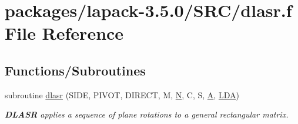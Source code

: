 \hypertarget{dlasr_8f}{}\section{packages/lapack-\/3.5.0/\+S\+R\+C/dlasr.f File Reference}
\label{dlasr_8f}
\subsection*{Functions/\+Subroutines}
\begin{DoxyCompactItemize}
\item 
subroutine \hyperlink{group__auxOTHERauxiliary_gaa0a984d2062d62286a7a78ed3ba06fda}{dlasr} (S\+I\+D\+E, P\+I\+V\+O\+T, D\+I\+R\+E\+C\+T, M, \hyperlink{polmisc_8c_a0240ac851181b84ac374872dc5434ee4}{N}, C, S, \hyperlink{classA}{A}, \hyperlink{example__user_8c_ae946da542ce0db94dced19b2ecefd1aa}{L\+D\+A})
\begin{DoxyCompactList}\small\item\em {\bfseries D\+L\+A\+S\+R} applies a sequence of plane rotations to a general rectangular matrix. \end{DoxyCompactList}\end{DoxyCompactItemize}

